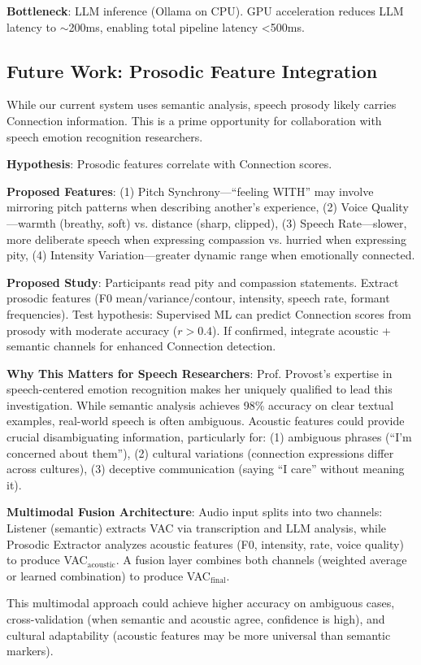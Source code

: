 \textbf{Bottleneck}: LLM inference (Ollama on CPU). GPU acceleration reduces LLM latency to $\sim$200ms, enabling total pipeline latency <500ms.

\subsection{Future Work: Prosodic Feature Integration}

While our current system uses semantic analysis, speech prosody likely carries Connection information. This is a prime opportunity for collaboration with speech emotion recognition researchers.

\textbf{Hypothesis}: Prosodic features correlate with Connection scores.

\textbf{Proposed Features}: (1) Pitch Synchrony—``feeling WITH'' may involve mirroring pitch patterns when describing another's experience, (2) Voice Quality—warmth (breathy, soft) vs. distance (sharp, clipped), (3) Speech Rate—slower, more deliberate speech when expressing compassion vs. hurried when expressing pity, (4) Intensity Variation—greater dynamic range when emotionally connected.

\textbf{Proposed Study}: Participants read pity and compassion statements. Extract prosodic features (F0 mean/variance/contour, intensity, speech rate, formant frequencies). Test hypothesis: Supervised ML can predict Connection scores from prosody with moderate accuracy ($r > 0.4$). If confirmed, integrate acoustic + semantic channels for enhanced Connection detection.

\textbf{Why This Matters for Speech Researchers}: Prof. Provost's expertise in speech-centered emotion recognition makes her uniquely qualified to lead this investigation. While semantic analysis achieves 98\% accuracy on clear textual examples, real-world speech is often ambiguous. Acoustic features could provide crucial disambiguating information, particularly for: (1) ambiguous phrases (``I'm concerned about them''), (2) cultural variations (connection expressions differ across cultures), (3) deceptive communication (saying ``I care'' without meaning it).

\textbf{Multimodal Fusion Architecture}: Audio input splits into two channels: Listener (semantic) extracts VAC via transcription and LLM analysis, while Prosodic Extractor analyzes acoustic features (F0, intensity, rate, voice quality) to produce VAC$_{\text{acoustic}}$. A fusion layer combines both channels (weighted average or learned combination) to produce VAC$_{\text{final}}$.

This multimodal approach could achieve higher accuracy on ambiguous cases, cross-validation (when semantic and acoustic agree, confidence is high), and cultural adaptability (acoustic features may be more universal than semantic markers).
